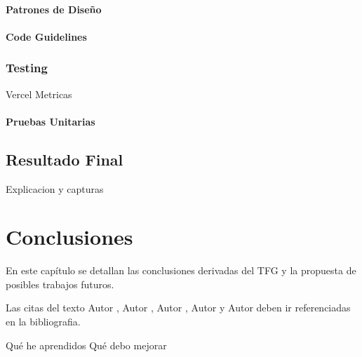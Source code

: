 \documentclass[12pt,twoside,titlepage]{report}
\newcommand\blankpage{%
    \newpage
    \null
    \thispagestyle{empty}%
    \newpage}
\begin{document}
\subsubsection{Patrones de Diseño}

\subsubsection{Code Guidelines}

\subsection{Testing}

Vercel Metricas

\subsubsection{Pruebas Unitarias}

\section{Resultado Final}

Explicacion y capturas

\newpage

\chapter{Conclusiones}

En este capítulo se detallan las conclusiones derivadas del TFG y la propuesta de posibles trabajos futuros.

Las citas del texto Autor \cite{giaquinta}, Autor \cite{fortune}, Autor \cite{fortuneB}, Autor \cite{mitchell} y Autor \cite{morrey} deben ir referenciadas en la bibliografia.


Qué he aprendidos
Qué debo mejorar

\blankpage




{}
\footnotesize{
%


}
\raggedbottom
\afterpage{\blankpage}
\newpage


\end{document}
